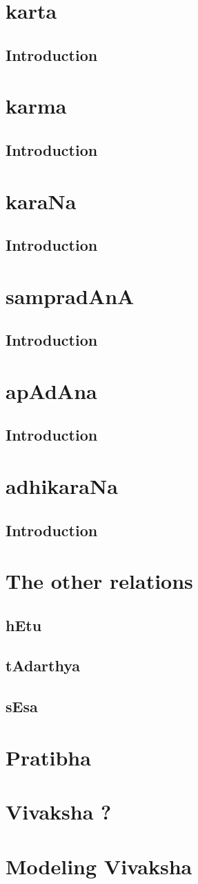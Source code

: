 \documentclass[a4paper,10pt]{article}
\begin{document}
\newpage
\section{karta}
  \subsection{Introduction}
\newpage
\section{karma}
  \subsection{Introduction}
\newpage
\section{karaNa}
  \subsection{Introduction}
\newpage
\section{sampradAnA}
  \subsection{Introduction}
\newpage
\section{apAdAna}
  \subsection{Introduction}
\newpage
\section{adhikaraNa}
  \subsection{Introduction}
\newpage
\section{The other relations}
  \subsection{hEtu}
  \subsection{tAdarthya}
  \subsection{sEsa}
\section{Pratibha}
\newpage
\section{Vivaksha ?}
\newpage
\section{Modeling Vivaksha}
\end{document}
